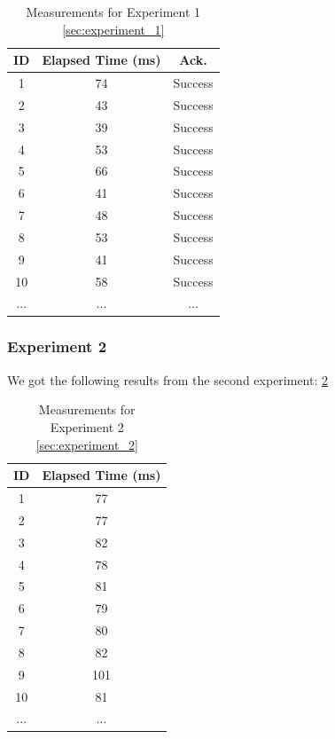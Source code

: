 \begin{table}[h]
    \centering
    \begin{tabular}{ccc}
       \textbf{ID} & \textbf{Elapsed Time (ms)} & \textbf{Ack.} \\ \hline
       1 & 74 & Success \\
       2 & 43 & Success \\
       3 & 39 & Success \\
       4 & 53 & Success \\
       5 & 66 & Success \\
       6 & 41 & Success \\
       7 & 48 & Success \\
       8 & 53 & Success \\
       9 & 41 & Success \\
       10 & 58 & Success \\
       ... & ... & ... \\
    \hline
    \end{tabular}
    \caption{Measurements for Experiment 1 \ref{sec:experiment_1}}
    \label{tab:experiment_1_results}
\end{table}

\subsubsection{Experiment 2}
We got the following results from the second experiment: \ref{tab:experiment_2_results}
\begin{table}[h]
    \centering
    \begin{tabular}{cc}
       \textbf{ID} & \textbf{Elapsed Time (ms)} \\ \hline
       1 & 77 \\
       2 & 77 \\
       3 & 82 \\
       4 & 78 \\
       5 & 81 \\
       6 & 79 \\
       7 & 80 \\
       8 & 82 \\
       9 & 101 \\
       10 & 81 \\
       ... & ... \\
    \hline
    \end{tabular}
    \caption{Measurements for Experiment 2 \ref{sec:experiment_2}}
    \label{tab:experiment_2_results}
\end{table}

